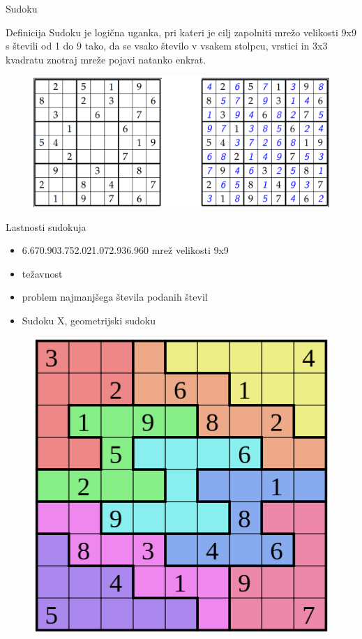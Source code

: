 \documentclass{beamer}
\begin{document}
\begin{frame}{Sudoku}

\begin{block}{Definicija}
Sudoku je logična uganka, pri kateri je cilj zapolniti mrežo velikosti 9x9 s števili od 1 do 9 tako, da se vsako število v vsakem stolpcu, vrstici in 3x3 kvadratu znotraj mreže pojavi natanko enkrat.
\end{block}

\begin{figure}
\centering
\includegraphics[scale=0.3]{sudoku_resen}
\end{figure}

\end{frame}


\begin{frame}{Lastnosti sudokuja}

\begin{itemize}
\item 6.670.903.752.021.072.936.960 mrež velikosti 9x9
\item težavnost
\item problem najmanjšega števila podanih števil
\item Sudoku X, geometrijski sudoku
\end{itemize}

\begin{figure}
\centering
\includegraphics[scale=0.25]{geo_sudoku}
\end{figure}

\end{frame}
\end{document}
